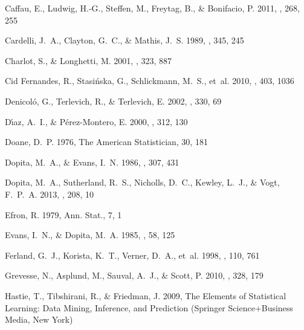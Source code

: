 \documentclass{emulateapj}
\begin{document}
\begin{thebibliography}{}
{Caffau}, E., {Ludwig}, H.-G., {Steffen}, M., {Freytag}, B., \& {Bonifacio}, P.
  2011, \solphys, 268, 255

{Cardelli}, J.~A., {Clayton}, G.~C., \& {Mathis}, J.~S. 1989, \apj, 345, 245

{Charlot}, S., \& {Longhetti}, M. 2001, \mnras, 323, 887

{Cid Fernandes}, R., {Stasi{\'n}ska}, G., {Schlickmann}, M.~S., {et~al.} 2010,
  \mnras, 403, 1036

{Denicol{\'o}}, G., {Terlevich}, R., \& {Terlevich}, E. 2002, \mnras, 330, 69

{D{\'{\i}}az}, A.~I., \& {P{\'e}rez-Montero}, E. 2000, \mnras, 312, 130

Doane, D.~P. 1976, The American Statistician, 30, 181

{Dopita}, M.~A., \& {Evans}, I.~N. 1986, \apj, 307, 431

{Dopita}, M.~A., {Sutherland}, R.~S., {Nicholls}, D.~C., {Kewley}, L.~J., \&
  {Vogt}, F.~P.~A. 2013, \apjs, 208, 10

{Efron}, R. 1979, Ann. Stat., 7, 1

{Evans}, I.~N., \& {Dopita}, M.~A. 1985, \apjs, 58, 125

{Ferland}, G.~J., {Korista}, K.~T., {Verner}, D.~A., {et~al.} 1998, \pasp, 110,
  761

{Grevesse}, N., {Asplund}, M., {Sauval}, A.~J., \& {Scott}, P. 2010, \apss,
  328, 179

{Hastie}, T., {Tibshirani}, R., \& {Friedman}, J. 2009, {The Elements of
  Statistical Learning: Data Mining, Inference, and Prediction} (Springer
  Science+Business Media, New York)


\end{thebibliography}
\end{document}
